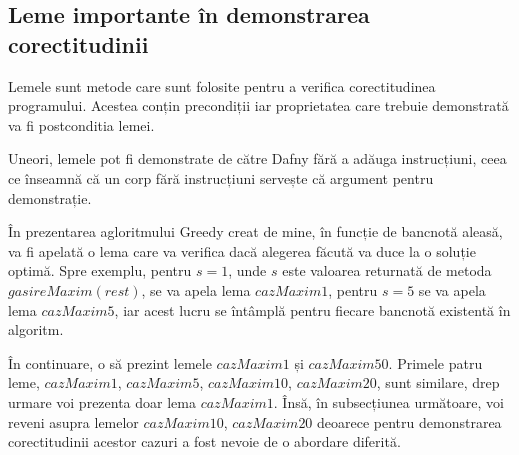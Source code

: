 \subsection{Leme importante în demonstrarea corectitudinii}
Lemele sunt metode care sunt folosite pentru a verifica corectitudinea programului. Acestea conțin precondiții iar proprietatea care trebuie demonstrată va fi postconditia lemei.\par
Uneori, lemele pot fi demonstrate de către Dafny fără a adăuga instrucțiuni, ceea ce înseamnă că un corp fără instrucțiuni servește că argument pentru demonstrație.
\par
În prezentarea agloritmului Greedy creat de mine, în funcție de bancnotă aleasă, va fi apelată o lema care va verifica dacă alegerea făcută va duce la o soluție optimă. Spre exemplu, pentru $s = 1$, unde $s$ este valoarea returnată de metoda \\ $gasireMaxim(rest)$, se va apela lema $cazMaxim1$, pentru $s = 5$ se va apela lema $cazMaxim5$, iar acest lucru se întâmplă pentru fiecare bancnotă existentă în algoritm. \par 
În continuare, o să prezint lemele $cazMaxim1$ și $cazMaxim50$. Primele patru leme, $cazMaxim1$, $cazMaxim5$, $cazMaxim10$, $cazMaxim20$, sunt similare, drep urmare voi prezenta doar lema $cazMaxim1$. Însă, în subsecțiunea următoare, voi reveni asupra lemelor $cazMaxim10$, $cazMaxim20$ deoarece pentru demonstrarea corectitudinii acestor cazuri a fost nevoie de o abordare diferită.
\vspace{2.5cm}
